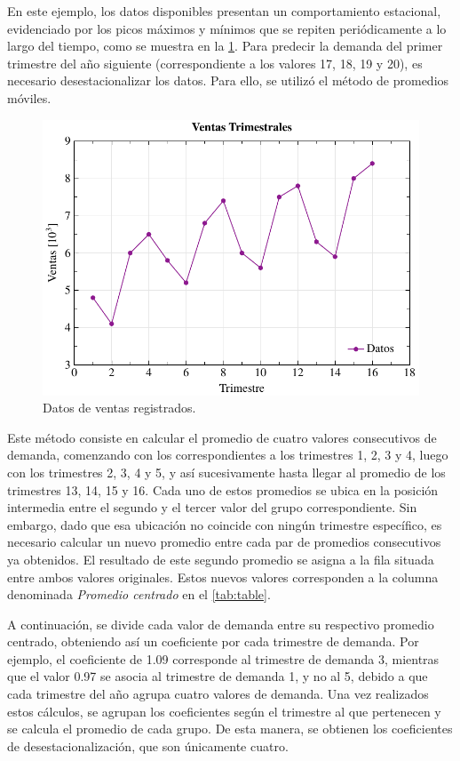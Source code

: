 En este ejemplo, los datos disponibles presentan un comportamiento estacional,
evidenciado por los picos máximos y mínimos que se repiten periódicamente a lo
largo del tiempo, como se muestra en la \cref{fig:season-data}.
Para predecir la demanda del primer trimestre del año siguiente
(correspondiente a los valores 17, 18, 19 y 20), es necesario
desestacionalizar los datos.
Para ello, se utilizó el método de promedios móviles.

\begin{figure}[htpb!]
  \centering
  \includegraphics[width=\columnwidth]{../Figures/season-data.pdf}
  \caption{Datos de ventas registrados.}
  \label{fig:season-data}
\end{figure}

Este método consiste en calcular el promedio de cuatro valores consecutivos de
demanda, comenzando con los correspondientes a los trimestres 1, 2, 3 y 4,
luego con los trimestres 2, 3, 4 y 5, y así sucesivamente hasta llegar al
promedio de los trimestres 13, 14, 15 y 16.
Cada uno de estos promedios se ubica en la posición intermedia entre el segundo
y el tercer valor del grupo correspondiente.
Sin embargo, dado que esa ubicación no coincide con ningún trimestre específico,
es necesario calcular un nuevo promedio entre cada par de promedios consecutivos
ya obtenidos.
El resultado de este segundo promedio se asigna a la fila situada entre ambos
valores originales.
Estos nuevos valores corresponden a la columna denominada \textit{Promedio centrado}
en el \cref{tab:table}.

A continuación, se divide cada valor de demanda entre su respectivo promedio
centrado, obteniendo así un coeficiente por cada trimestre de demanda.
Por ejemplo, el coeficiente de 1.09 corresponde al trimestre de demanda 3, mientras
que el valor 0.97 se asocia al trimestre de demanda 1, y no al 5, debido a que
cada trimestre del año agrupa cuatro valores de demanda.
Una vez realizados estos cálculos, se agrupan los coeficientes según el
trimestre al que pertenecen y se calcula el promedio de cada grupo.
De esta manera, se obtienen los coeficientes de desestacionalización, que son
únicamente cuatro.

